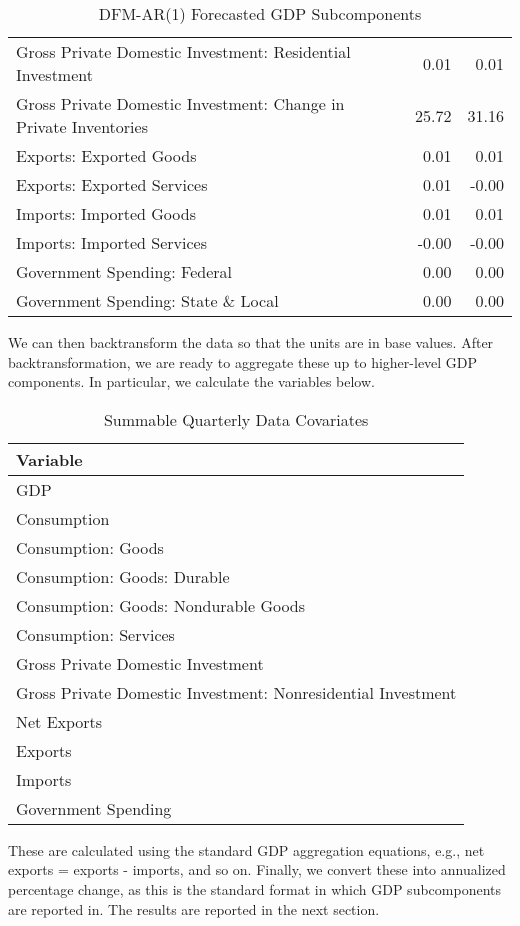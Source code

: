 \documentclass[11pt, letterpaper]{article}\usepackage[]{graphicx}\usepackage[]{color}
\begin{document}
\begin{table}[H]
\begin{tabular}{lrr}
  Gross Private Domestic Investment: Residential Investment & 0.01 & 0.01 \\ 
  Gross Private Domestic Investment: Change in Private Inventories & 25.72 & 31.16 \\ 
  Exports: Exported Goods & 0.01 & 0.01 \\ 
  Exports: Exported Services & 0.01 & -0.00 \\ 
  Imports: Imported Goods & 0.01 & 0.01 \\ 
  Imports: Imported Services & -0.00 & -0.00 \\ 
  Government Spending: Federal & 0.00 & 0.00 \\ 
  Government Spending: State \& Local & 0.00 & 0.00 \\ 
   \hline
\end{tabular}
\endgroup
\caption{DFM-AR(1) Forecasted GDP Subcomponents} 
\end{table}


We can then backtransform the data so that the units are in base values. After backtransformation, we are ready to aggregate these up to higher-level GDP components. In particular, we calculate the variables below.
\begin{table}[H]
\centering
\begingroup\scriptsize
\begin{tabular}{l}
  \hline
Variable \\ 
  \hline
GDP \\ 
  Consumption \\ 
  Consumption: Goods \\ 
  Consumption: Goods: Durable \\ 
  Consumption: Goods: Nondurable Goods \\ 
  Consumption: Services \\ 
  Gross Private Domestic Investment \\ 
  Gross Private Domestic Investment: Nonresidential Investment \\ 
  Net Exports \\ 
  Exports \\ 
  Imports \\ 
  Government Spending \\ 
   \hline
\end{tabular}
\endgroup
\caption{Summable Quarterly Data Covariates} 
\end{table}

These are calculated using the standard GDP aggregation equations, e.g., net exports = exports - imports, and so on.
Finally, we convert these into annualized percentage change, as this is the standard format in which GDP subcomponents are reported in. The results are reported in the next section.
\end{document}
